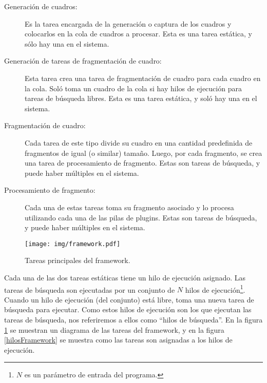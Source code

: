 \begin{description}

	\item[Generación de cuadros:] Es la tarea encargada de la generación o
		captura de los cuadros y colocarlos en la cola de cuadros a
		procesar. Esta es una tarea estática, y sólo hay una en el
		sistema.

	\item[Generación de tareas de fragmentación de cuadro:] Esta tarea crea
		una tarea de fragmentación de cuadro para cada cuadro en la
		cola. Soló toma un cuadro de la cola si hay hilos de ejecución
		para tareas de búsqueda libres. Esta es una tarea estática, y
		soló hay una en el sistema.

	\item[Fragmentación de cuadro:] Cada tarea de este tipo divide su cuadro
		en una cantidad predefinida de fragmentos de igual (o similar)
		tamaño. Luego, por cada fragmento, se crea una tarea de
		procesamiento de fragmento. Estas son tareas de búsqueda, y
		puede haber múltiples en el sistema.

	\item[Procesamiento de fragmento:] Cada una de estas tareas toma su
		fragmento asociado y lo procesa utilizando cada una de las pilas
		de plugins. Estas son tareas de búsqueda, y puede haber
		múltiples en el sistema.

\end{description}

\begin{figure}[h]

	\centering

	\texttt{[image: img/framework.pdf]}

	\caption{Tareas principales del framework.}

	\label{tareasFramework}

\end{figure}

Cada una de las dos tareas estáticas tiene un hilo de ejecución asignado. Las
tareas de búsqueda son ejecutadas por un conjunto de $N$ hilos de
ejecución\footnote{$N$ es un parámetro de entrada del programa.}. Cuando un hilo
de ejecución (del conjunto) está libre, toma una nueva tarea de búsqueda para
ejecutar. Como estos hilos de ejecución son los que ejecutan las tareas de
búsqueda, nos referiremos a ellos como ``hilos de búsqueda''. En la figura
\ref{tareasFramework} se muestran un diagrama de las tareas del framework, y en
la figura \ref{hilosFramework} se muestra como las tareas son asignadas a los
hilos de ejecución.

